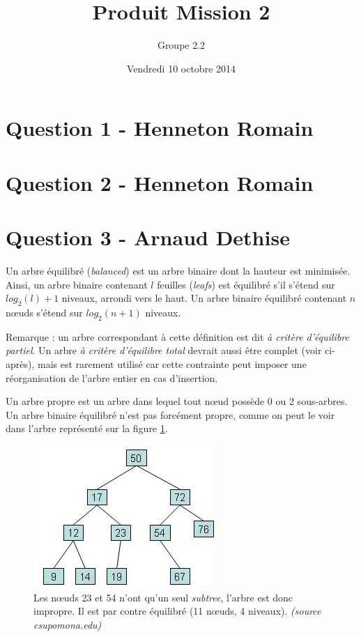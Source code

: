 \documentclass[10pt,a4paper]{article}
\date{Vendredi 10 octobre 2014}
\author{Groupe 2.2}
\title{Produit Mission 2 }
\begin{document}
\maketitle

\section*{Question 1 - Henneton Romain}
\section*{Question 2 - Henneton Romain}


\section*{Question 3 - Arnaud Dethise}

	Un arbre équilibré (\textit{balanced}) est un arbre binaire dont la hauteur est minimisée. Ainsi, un arbre binaire contenant $l$ feuilles (\textit{leafs}) est équilibré s'il s'étend sur $log_{2}(l)+1$ niveaux, arrondi vers le haut.
	Un arbre binaire équilibré contenant $n$ nœuds s'étend sur $log_{2}(n+1)$ niveaux.
	
	Remarque : un arbre correspondant à cette définition est dit \textit{à critère d'équilibre partiel}. Un arbre \textit{à critère d'équilibre total} devrait aussi être complet (voir ci-après), mais est rarement utilisé car cette contrainte peut imposer une réorganisation de l'arbre entier en cas d'insertion.
	
	Un arbre propre est un arbre dans lequel tout nœud possède 0 ou 2 sous-arbres.
	Un arbre binaire équilibré n'est pas forcément propre, comme on peut le voir dans l'arbre représenté sur la figure \ref{balanced_improper_tree}.
	
	\begin{figure}[!h]
	\begin{center}
		\includegraphics[scale=.7]{q3-balanced_improper_tree.png}
		\caption{Les nœuds 23 et 54 n'ont qu'un seul \textit{subtree}, l'arbre est donc impropre. Il est par contre équilibré (11 nœuds, 4 niveaux). \textit{(source csupomona.edu)}}
		\label{balanced_improper_tree}
	\end{center}
	\end{figure}
	
\end{document}
